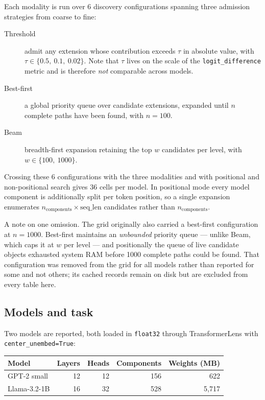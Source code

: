 \documentclass[11pt,a4paper]{article}
\begin{document}
Each modality is run over 6 discovery configurations spanning three
admission strategies from coarse to fine:

\begin{description}
  \item[Threshold] admit any extension whose contribution exceeds $\tau$ in absolute value,
    with $\tau \in \{0.5,\ 0.1,\ 0.02\}$. Note that $\tau$ lives on the scale of the
    \texttt{logit\_difference} metric and is therefore \emph{not} comparable across models.
  \item[Best-first] a global priority queue over candidate extensions, expanded until $n$
    complete paths have been found, with $n = 100$.
  \item[Beam] breadth-first expansion retaining the top $w$ candidates per level, with
    $w \in \{100,\ 1000\}$.
\end{description}

Crossing these 6 configurations with the three modalities and with positional
and non-positional search gives 36 cells per model. In positional mode every
model component is additionally split per token position, so a single expansion enumerates
$n_\text{components} \times \text{seq\_len}$ candidates rather than $n_\text{components}$.

A note on one omission. The grid originally also carried a best-first configuration at
$n = 1000$. Best-first maintains an \emph{unbounded} priority queue --- unlike Beam, which
caps it at $w$ per level --- and positionally the queue of live candidate objects exhausted
system RAM before 1000 complete paths could be found. That configuration was removed from the
grid for all models rather than reported for some and not others; its cached records remain on
disk but are excluded from every table here.

\subsection{Models and task}

Two models are reported, both loaded in \texttt{float32} through TransformerLens with
\texttt{center\_unembed=True}:

\begin{center}
\begin{tabular}{lrrrr}
\toprule
Model & Layers & Heads & Components & Weights (MB) \\
\midrule
GPT-2 small & 12 & 12 & 156 & 622 \\
Llama-3.2-1B & 16 & 32 & 528 & 5,717 \\
\bottomrule
\end{tabular}
\end{center}
\end{document}
